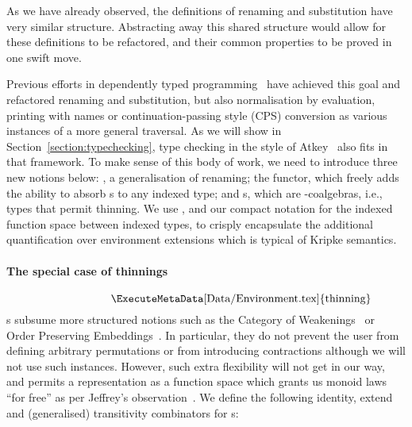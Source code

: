 As we have already observed, the definitions of renaming and substitution have very
similar structure. Abstracting away this shared structure would allow for these
definitions to be refactored, and their common properties to be proved in one swift
move.

Previous efforts in dependently typed
programming~\cite{benton2012strongly,allais2017type}
have achieved this goal and refactored renaming and substitution,
but also normalisation by evaluation, printing with names or continuation-passing style (CPS) conversion
as various instances of a more general traversal. As we will show in Section~\ref{section:typechecking},
type checking in the style of Atkey~\citeyear{atkey2015algebraic} also
fits in that framework. To make sense of this body of work, we
need to introduce three new notions below: , a generalisation of
renaming; the
 functor, which freely adds the ability to absorb s to any indexed type; and s, which are -coalgebras, i.e., types that permit thinning.
We use , and our compact notation for the indexed function space
between indexed types, to crisply encapsulate the additional quantification
over environment extensions which is typical of Kripke semantics.

\paragraph*{The special case of thinnings}
\begin{displaymath}
  \begin{minipage}{0.5\linewidth}
    \ExecuteMetaData[Data/Environment.tex]{thinning}
  \end{minipage}
\end{displaymath}
s subsume more structured notions such as the Category of
Weakenings~\cite{altenkirch1995categorical} or Order Preserving
Embeddings~\cite{chapman2009type}. In particular, they do not prevent the
user from defining arbitrary permutations or from introducing contractions
although we will not use such instances. However, such extra flexibility
will not get in our way, and permits a representation as a function space
which grants us monoid laws ``for free'' as per Jeffrey's
observation~\citeyear{jeffrey2011assoc}. We define the following identity, extend and (generalised) transitivity combinators for s:
\begin{center}
\begin{minipage}{0.45\textwidth}
\end{minipage}
\begin{minipage}{0.45\textwidth}
\end{minipage}
\end{center}


